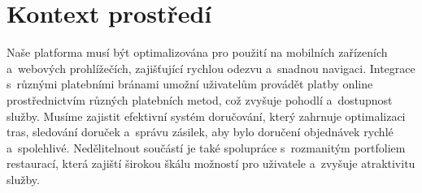 \section{Kontext prostředí}

        Naše platforma musí být optimalizována pro použití na mobilních zařízeních a~webových prohlížečích, zajišťující rychlou odezvu a~snadnou navigaci.
        Integrace s~různými platebními bránami umožní uživatelům provádět platby online prostřednictvím různých platebních metod, což zvyšuje pohodlí a~dostupnost služby.
        Musíme zajistit efektivní systém doručování, který zahrnuje optimalizaci tras, sledování doruček a~správu zásilek, aby bylo doručení objednávek rychlé a~spolehlivé.
        Nedělitelnout součástí je také spolupráce s~rozmanitým portfoliem restaurací, která zajiští širokou škálu možností pro uživatele a~zvyšuje atraktivitu služby.

\pagebreak
	
